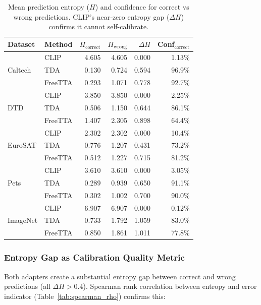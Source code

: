 \documentclass[12pt,a4paper]{article}
\newcommand{\1}{\mathbf{1}}
\begin{document}
\begin{table}[H]
\centering
\caption{Mean prediction entropy ($H$) and confidence for correct vs wrong predictions.
CLIP's near-zero entropy gap ($\Delta H$) confirms it cannot self-calibrate.}
\label{tab:entropy_calibration}
\begin{tabular}{@{}llrrrr@{}}
\toprule
Dataset & Method & $H_\text{correct}$ & $H_\text{wrong}$ & $\Delta H$ & Conf$_\text{correct}$ \\
\midrule
\multirow{3}{*}{Caltech}
 & CLIP    & 4.605 & 4.605 & 0.000 & 1.13\% \\
 & TDA     & 0.130 & 0.724 & 0.594 & 96.9\% \\
 & FreeTTA & 0.293 & 1.071 & 0.778 & 92.7\% \\
\midrule
\multirow{3}{*}{DTD}
 & CLIP    & 3.850 & 3.850 & 0.000 & 2.25\% \\
 & TDA     & 0.506 & 1.150 & 0.644 & 86.1\% \\
 & FreeTTA & 1.407 & 2.305 & 0.898 & 64.4\% \\
\midrule
\multirow{3}{*}{EuroSAT}
 & CLIP    & 2.302 & 2.302 & 0.000 & 10.4\% \\
 & TDA     & 0.776 & 1.207 & 0.431 & 73.2\% \\
 & FreeTTA & 0.512 & 1.227 & 0.715 & 81.2\% \\
\midrule
\multirow{3}{*}{Pets}
 & CLIP    & 3.610 & 3.610 & 0.000 & 3.05\% \\
 & TDA     & 0.289 & 0.939 & 0.650 & 91.1\% \\
 & FreeTTA & 0.302 & 1.002 & 0.700 & 90.0\% \\
\midrule
\multirow{3}{*}{ImageNet}
 & CLIP    & 6.907 & 6.907 & 0.000 & 0.12\% \\
 & TDA     & 0.733 & 1.792 & 1.059 & 83.0\% \\
 & FreeTTA & 0.850 & 1.861 & 1.011 & 77.8\% \\
\bottomrule
\end{tabular}
\end{table}

\subsubsection{Entropy Gap as Calibration Quality Metric}

Both adapters create a substantial entropy gap between correct and wrong predictions (all $\Delta H > 0.4$).
Spearman rank correlation between entropy and error indicator (Table~\ref{tab:spearman_rho}) confirms this:
\end{document}
